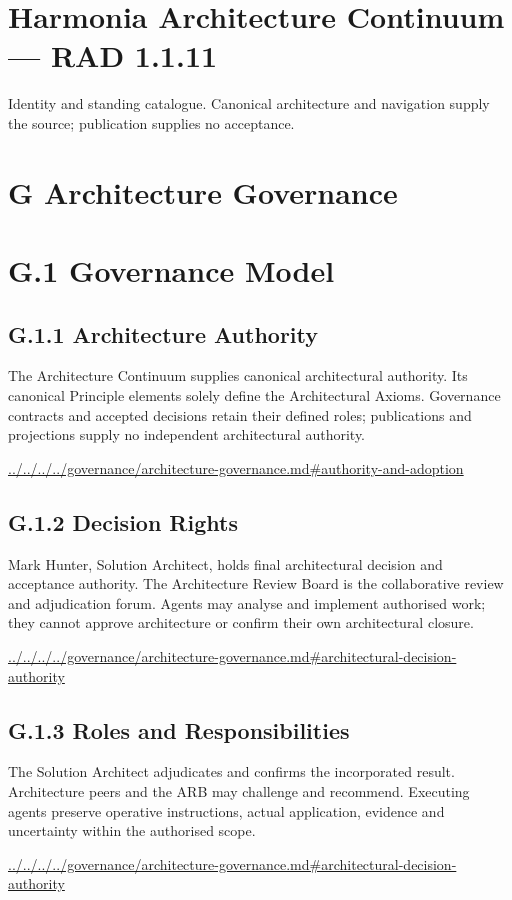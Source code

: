 \documentclass[10pt,a4paper]{article}
\begin{document}
\section*{Harmonia Architecture Continuum — RAD 1.1.11}
Identity and standing catalogue. Canonical architecture and navigation supply the source; publication supplies no acceptance.\par
\section*{G Architecture Governance}
\section*{G.1 Governance Model}
\subsection*{G.1.1 Architecture Authority}
The Architecture Continuum supplies canonical architectural authority. Its canonical Principle elements solely define the Architectural Axioms. Governance contracts and accepted decisions retain their defined roles; publications and projections supply no independent architectural authority.\par
{\footnotesize\url{../../../../governance/architecture-governance.md#authority-and-adoption}}\par
\subsection*{G.1.2 Decision Rights}
Mark Hunter, Solution Architect, holds final architectural decision and acceptance authority. The Architecture Review Board is the collaborative review and adjudication forum. Agents may analyse and implement authorised work; they cannot approve architecture or confirm their own architectural closure.\par
{\footnotesize\url{../../../../governance/architecture-governance.md#architectural-decision-authority}}\par
\subsection*{G.1.3 Roles and Responsibilities}
The Solution Architect adjudicates and confirms the incorporated result. Architecture peers and the ARB may challenge and recommend. Executing agents preserve operative instructions, actual application, evidence and uncertainty within the authorised scope.\par
{\footnotesize\url{../../../../governance/architecture-governance.md#architectural-decision-authority}}\par
\end{document}
